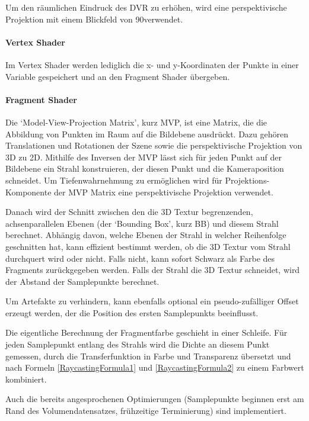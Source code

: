 \documentclass[a4paper,fontsize=12pt,toc=bib,halfparskip]{scrartcl}
\begin{document}
Um den r\"aumlichen Eindruck des DVR zu erh\"ohen, wird eine perspektivische Projektion mit einem Blickfeld von 90\textdegree verwendet.

\paragraph{Vertex Shader}
Im Vertex Shader werden lediglich die x- und y-Koordinaten der Punkte in einer Variable gespeichert und an den Fragment Shader \"ubergeben.

\paragraph{Fragment Shader}
Die `Model-View-Projection Matrix', kurz MVP, ist eine Matrix, die die Abbildung von Punkten im Raum auf die Bildebene ausdr\"uckt. Dazu geh\"oren Translationen und Rotationen der Szene sowie die perspektivische Projektion von 3D zu 2D. Mithilfe des Inversen der MVP l\"asst sich f\"ur jeden Punkt auf der Bildebene ein Strahl konstruieren, der diesen Punkt und die Kameraposition schneidet. Um Tiefenwahrnehmung zu erm\"oglichen wird f\"ur Projektions-Komponente der MVP Matrix eine perspektivische Projektion verwendet.

Danach wird der Schnitt zwischen den die 3D Textur begrenzenden, achsenparallelen Ebenen (der `Bounding Box', kurz BB) und diesem Strahl berechnet. Abh\"angig davon, welche Ebenen der Strahl in welcher Reihenfolge geschnitten hat, kann effizient bestimmt werden, ob die 3D Textur vom Strahl durchquert wird oder nicht. Falls nicht, kann sofort Schwarz als Farbe des Fragments zur\"uckgegeben werden. Falls der Strahl die 3D Textur schneidet, wird der Abstand der Samplepunkte berechnet. 

Um Artefakte zu verhindern, kann ebenfalls optional ein pseudo-zuf\"alliger Offset erzeugt werden, der die Position des ersten Samplepunkts beeinflusst.

Die eigentliche Berechnung der Fragmentfarbe geschieht in einer Schleife. F\"ur jeden Samplepunkt entlang des Strahls wird die Dichte an diesem Punkt gemessen, durch die Transferfunktion in Farbe und Transparenz  \"ubersetzt und nach Formeln \ref{RaycastingFormula1} und \ref{RaycastingFormula2} zu einem Farbwert kombiniert. 

Auch die bereits angesprochenen Optimierungen (Samplepunkte beginnen erst am Rand des Volumendatensatzes, fr\"uhzeitige Terminierung) sind implementiert.
\end{document}
